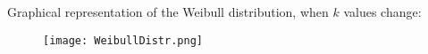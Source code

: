 \begin{frame}
  \vspace*{.5cm}
  \centering
  Graphical representation of the Weibull distribution, when $ k $ values change: \\
  \begin{figure}
    \texttt{[image: WeibullDistr.png]}
  \end{figure}
\end{frame}


